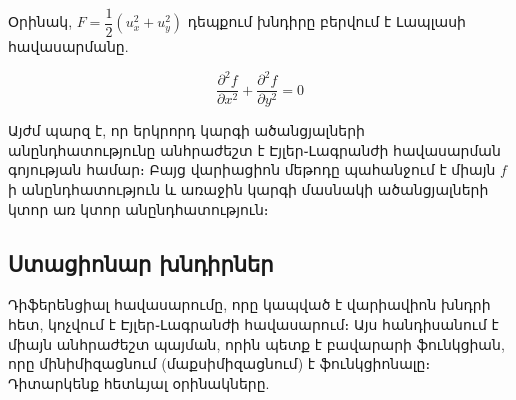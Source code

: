 \documentclass[fleqn, bachelor,subf,12pt,notitlepage]{disser}
\begin{document}
\noindent Օրինակ, $F = \dfrac{1}{2}\left(u_{x}^2+u_{y}^2\right)$ դեպքում խնդիրը բերվում է Լապլասի հավասարմանը.

$$\dfrac{\partial^{2}f}{\partial x^{2}} + \dfrac{\partial^{2}f}{\partial y^{2}} = 0$$


Այժմ պարզ է, որ երկրորդ կարգի ածանցյալների անընդհատությունը անհրաժեշտ է Էյլեր֊Լագրանժի հավասարման գոյության համար։ Բայց վարիացիոն մեթոդը պահանջում է միայն $f$ ի անընդհատություն և առաջին կարգի մասնակի ածանցյալների կտոր առ կտոր անընդհատություն։

\subsection*{Ստացիոնար խնդիրներ} %

Դիֆերենցիալ հավասարումը, որը կապված է վարիավիոն խնդրի հետ, կոչվում է Էյլեր֊Լագրանժի հավասարում։ Այս հանդիսանում է միայն անհրաժեշտ պայման, որին պետք է բավարարի ֆունկցիան, որը մինիմիզացնում (մաքսիմիզացնում) է ֆունկցիոնալը։ 
Դիտարկենք հետևյալ օրինակները.
\end{document}
